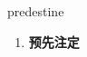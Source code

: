 
\begin{frame}
{\huge predestine}
\begin{center}
\begin{enumerate}\Large
  \item \textbf{预先注定}
\end{enumerate}
\end{center}
\end{frame}
